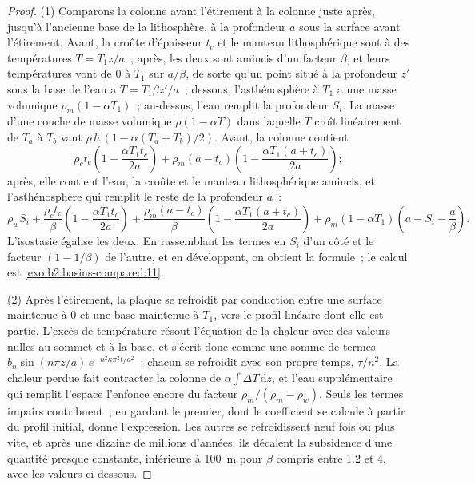 \begin{proof}
(1) Comparons la colonne avant l'étirement à la colonne juste après, jusqu'à l'ancienne base de la lithosphère,
à la profondeur $a$ sous la surface avant l'étirement. Avant, la croûte d'épaisseur $t_c$ et le manteau
lithosphérique sont à des températures $T = T_1 z/a$~; après, les deux sont amincis d'un facteur $\beta$,
et leurs températures vont de $0$ à $T_1$ sur $a/\beta$, de sorte qu'un point situé à la profondeur $z'$ sous la base
de l'eau a $T = T_1\beta z'/a$~; dessous, l'asthénosphère à $T_1$ a une masse volumique $\rho_m(1 - \alpha T_1)$~;
au-dessus, l'eau remplit la profondeur $S_i$. La masse d'une couche de masse volumique $\rho(1 - \alpha T)$
dans laquelle $T$ croît linéairement de $T_a$ à $T_b$ vaut $\rho\,h\,(1 - \alpha(T_a + T_b)/2)$.
Avant, la colonne contient
\[
  \rho_c t_c\left(1 - \frac{\alpha T_1 t_c}{2a}\right)
  + \rho_m (a - t_c)\left(1 - \frac{\alpha T_1 (a + t_c)}{2a}\right);
\]
après, elle contient l'eau, la croûte et le manteau lithosphérique amincis, et l'asthénosphère qui
remplit le reste de la profondeur $a$~:
\[
  \rho_w S_i + \frac{\rho_c t_c}{\beta}\left(1 - \frac{\alpha T_1 t_c}{2a}\right)
  + \frac{\rho_m (a - t_c)}{\beta}\left(1 - \frac{\alpha T_1 (a + t_c)}{2a}\right)
  + \rho_m(1 - \alpha T_1)\left(a - S_i - \frac{a}{\beta}\right).
\]
L'isostasie égalise les deux. En rassemblant les termes en $S_i$ d'un côté et le facteur
$(1 - 1/\beta)$ de l'autre, et en développant, on obtient la formule~; le calcul est
\cref{exo:b2:basins-compared:11}.

(2) Après l'étirement, la plaque se refroidit par conduction entre une surface maintenue à $0$ et une base maintenue
à $T_1$, vers le profil linéaire dont elle est partie. L'excès de température résout l'équation de la chaleur
avec des valeurs nulles au sommet et à la base, et s'écrit donc comme une somme de termes
$b_n\sin(n\pi z/a)\,e^{-n^2\kappa\pi^2 t/a^2}$~; chacun se refroidit avec son propre temps, $\tau/n^2$. La chaleur perdue
fait contracter la colonne de $\alpha\int \Delta T\,\mathrm{d}z$, et l'eau supplémentaire qui remplit l'espace l'enfonce encore
du facteur $\rho_m/(\rho_m - \rho_w)$. Seuls les termes impairs contribuent~; en gardant le premier, dont le coefficient
se calcule à partir du profil initial, donne l'expression. Les autres se refroidissent neuf fois ou plus vite,
et après une dizaine de millions d'années, ils décalent la subsidence d'une quantité presque constante, inférieure
à \qty{100}{m} pour $\beta$ compris entre 1.2
et 4, avec les valeurs ci-dessous.
\end{proof}

